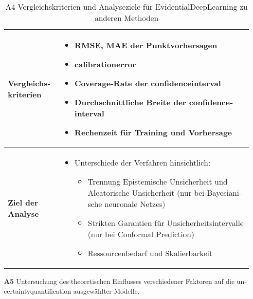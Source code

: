 \begin{otherlanguage}{ngerman}
\begin{table}[htbp]
\begin{tabularx}{\textwidth}{|l|X|}
  \multirow{7}{*}{\textbf{Vergleichskriterien}} &
  \begin{itemize}[topsep=0em, itemsep=0em, leftmargin=*, label={}]
    \item RMSE, MAE der Punktvorhersagen
    \item \gls{calibrationerror}
    \item Coverage-Rate der \gls{confidenceinterval}
    \item Durchschnittliche Breite der \gls{confidenceinterval}
    \item Rechenzeit für Training und Vorhersage
  \end{itemize}
  \\ \hline

  \multirow{6}{*}{\textbf{Ziel der Analyse}} &
  \begin{itemize}[topsep=0em, itemsep=0em, leftmargin=*, label={}]
    \item Unterschiede der Verfahren hinsichtlich:
      \begin{itemize}[topsep=0em, itemsep=0em, leftmargin=*, label={}]
        \item Trennung \gls{Epistemische Unsicherheit} und \gls{Aleatorische Unsicherheit} (nur bei \gls{Bayesianische neuronale Netze}s)
        \item Strikten Garantien für Unsicherheitsintervalle (nur bei \gls{Conformal Prediction})
        \item Ressourcenbedarf und Skalierbarkeit
      \end{itemize}
  \end{itemize}
  \\ \hline

  \end{tabularx}
  \caption{A4 Vergleichskriterien und Analyseziele für \gls{EvidentialDeepLearning} zu anderen Methoden}
  \label{tab:vergleichskriterien}
\end{table}


\textbf{A5} Untersuchung des theoretischen Einflusses verschiedener Faktoren auf die \gls{uncertaintyquantification} ausgewählter Modelle.



\end{otherlanguage}
